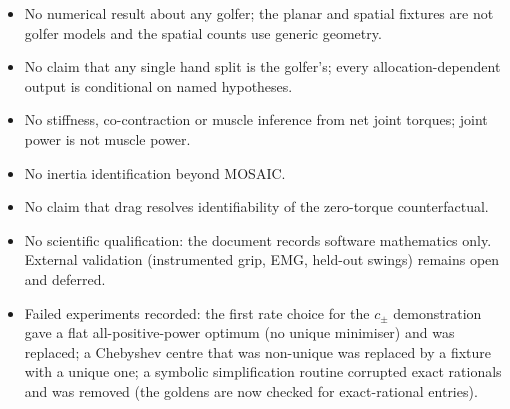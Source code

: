\documentclass[11pt,a4paper]{article}
\begin{document}
\begin{itemize}[leftmargin=*]
\item No numerical result about any golfer; the planar and spatial fixtures are
not golfer models and the spatial counts use generic geometry.
\item No claim that any single hand split is the golfer's; every
allocation-dependent output is conditional on named hypotheses.
\item No stiffness, co-contraction or muscle inference from net joint torques;
joint power is not muscle power.
\item No inertia identification beyond MOSAIC.
\item No claim that drag resolves identifiability of the zero-torque
counterfactual.
\item No scientific qualification: the document records software mathematics
only.  External validation (instrumented grip, EMG, held-out swings) remains
open and deferred.
\item Failed experiments recorded: the first rate choice for the
$c_\pm$ demonstration gave a flat all-positive-power optimum (no unique
minimiser) and was replaced; a Chebyshev centre that was non-unique was
replaced by a fixture with a unique one; a symbolic simplification routine
corrupted exact rationals and was removed (the goldens are now checked for
exact-rational entries).
\end{itemize}
\end{document}
